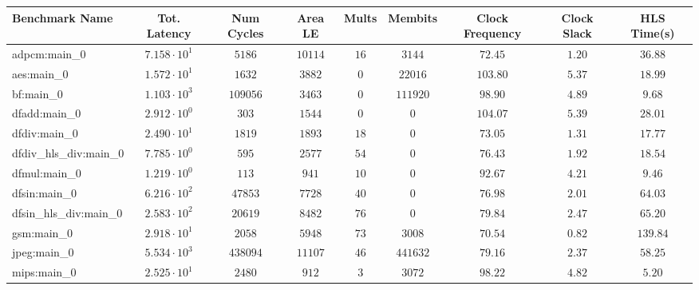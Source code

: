 \begin{tabular}{|l|c|c|c|c|c|c|c|c|}
\hline
Benchmark Name          & Tot. Latency           & Num Cycles & Area LE   & Mults   & Membits    & Clock Frequency & Clock Slack & HLS Time(s) \\
\hline
adpcm:main\_0           & $ 7.158 \cdot 10^{1} $ & $ 5186   $ & $ 10114 $ & $ 16  $ & $ 3144   $ & $ 72.45       $ & $ 1.20    $ & $ 36.88   $ \\
aes:main\_0             & $ 1.572 \cdot 10^{1} $ & $ 1632   $ & $ 3882  $ & $ 0   $ & $ 22016  $ & $ 103.80      $ & $ 5.37    $ & $ 18.99   $ \\
bf:main\_0              & $ 1.103 \cdot 10^{3} $ & $ 109056 $ & $ 3463  $ & $ 0   $ & $ 111920 $ & $ 98.90       $ & $ 4.89    $ & $ 9.68    $ \\
dfadd:main\_0           & $ 2.912 \cdot 10^{0} $ & $ 303    $ & $ 1544  $ & $ 0   $ & $ 0      $ & $ 104.07      $ & $ 5.39    $ & $ 28.01   $ \\
dfdiv:main\_0           & $ 2.490 \cdot 10^{1} $ & $ 1819   $ & $ 1893  $ & $ 18  $ & $ 0      $ & $ 73.05       $ & $ 1.31    $ & $ 17.77   $ \\
dfdiv\_hls\_div:main\_0 & $ 7.785 \cdot 10^{0} $ & $ 595    $ & $ 2577  $ & $ 54  $ & $ 0      $ & $ 76.43       $ & $ 1.92    $ & $ 18.54   $ \\
dfmul:main\_0           & $ 1.219 \cdot 10^{0} $ & $ 113    $ & $ 941   $ & $ 10  $ & $ 0      $ & $ 92.67       $ & $ 4.21    $ & $ 9.46    $ \\
dfsin:main\_0           & $ 6.216 \cdot 10^{2} $ & $ 47853  $ & $ 7728  $ & $ 40  $ & $ 0      $ & $ 76.98       $ & $ 2.01    $ & $ 64.03   $ \\
dfsin\_hls\_div:main\_0 & $ 2.583 \cdot 10^{2} $ & $ 20619  $ & $ 8482  $ & $ 76  $ & $ 0      $ & $ 79.84       $ & $ 2.47    $ & $ 65.20   $ \\
gsm:main\_0             & $ 2.918 \cdot 10^{1} $ & $ 2058   $ & $ 5948  $ & $ 73  $ & $ 3008   $ & $ 70.54       $ & $ 0.82    $ & $ 139.84  $ \\
jpeg:main\_0            & $ 5.534 \cdot 10^{3} $ & $ 438094 $ & $ 11107 $ & $ 46  $ & $ 441632 $ & $ 79.16       $ & $ 2.37    $ & $ 58.25   $ \\
mips:main\_0            & $ 2.525 \cdot 10^{1} $ & $ 2480   $ & $ 912   $ & $ 3   $ & $ 3072   $ & $ 98.22       $ & $ 4.82    $ & $ 5.20    $ \\

\end{tabular}

